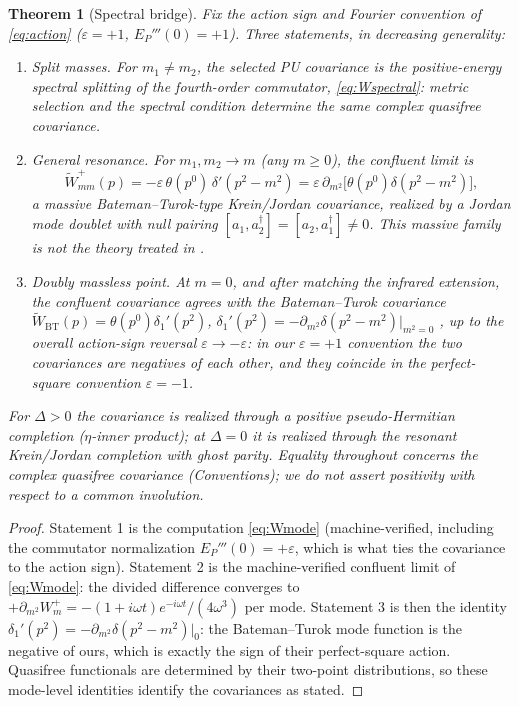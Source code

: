 \documentclass[11pt]{article}
\newtheorem{theorem}{Theorem}[section]
\theoremstyle{definition}
\theoremstyle{remark}
\newcommand{\w}{\omega}
\newcommand{\dg}{\dagger}
\begin{document}
\begin{theorem}[Spectral bridge]\label{thm:bridge}
Fix the action sign and Fourier convention of \eqref{eq:action}
($\varepsilon=+1$, $E_P'''(0)=+1$).  Three statements, in decreasing
generality:
\begin{enumerate}
\item \emph{Split masses.}  For $m_1\ne m_2$, the selected PU covariance
is the positive-energy spectral splitting of the fourth-order
commutator, \eqref{eq:Wspectral}: metric selection and the spectral
condition determine the same complex quasifree covariance.
\item \emph{General resonance.}  For $m_1,m_2\to m$ (any $m\ge0$), the
confluent limit is
\begin{equation}
\widetilde W^+_{mm}(p)=-\varepsilon\,\theta(p^0)\,\delta'(p^2-m^2)
=\varepsilon\,\partial_{m^2}\big[\theta(p^0)\delta(p^2-m^2)\big],
\end{equation}
a \emph{massive Bateman--Turok-type} Krein/Jordan covariance, realized
by a Jordan mode doublet with null pairing
$[a_1,a_2^{\dg}]=[a_2,a_1^{\dg}]\ne0$.  This massive family is not the
theory treated in \cite{BT2026}.
\item \emph{Doubly massless point.}  At $m=0$, and after matching the
infrared extension, the confluent covariance agrees with the
Bateman--Turok covariance
$\widetilde W_{\mathrm{BT}}(p)=\theta(p^0)\delta_1'(p^2)$,
$\delta_1'(p^2)=-\partial_{m^2}\delta(p^2-m^2)|_{m^2=0}$
\cite{BT2026}, up to the overall action-sign reversal
$\varepsilon\to-\varepsilon$: in our $\varepsilon=+1$ convention the two
covariances are negatives of each other, and they coincide in the
perfect-square convention $\varepsilon=-1$.
\end{enumerate}
For $\Delta>0$ the covariance is realized through a positive
pseudo-Hermitian completion ($\eta$-inner product); at $\Delta=0$ it is
realized through the resonant Krein/Jordan completion with ghost parity.
Equality throughout concerns the complex quasifree covariance
(Conventions); we do not assert positivity with respect to a common
involution.
\end{theorem}

\begin{proof}
Statement 1 is the computation \eqref{eq:Wmode} (machine-verified,
including the commutator normalization $E_P'''(0)=+\varepsilon$, which is
what ties the covariance to the action sign).  Statement 2 is the
machine-verified confluent limit of \eqref{eq:Wmode}: the divided
difference converges to $+\partial_{m^2}W^+_m
=-(1+i\w t)e^{-i\w t}/(4\w^3)$ per mode.  Statement 3 is then the
identity $\delta_1'(p^2)=-\partial_{m^2}\delta(p^2-m^2)|_0$: the
Bateman--Turok mode function is the negative of ours, which is exactly
the sign of their perfect-square action.  Quasifree functionals are
determined by their two-point distributions, so these mode-level
identities identify the covariances as stated.
\end{proof}
\end{document}
